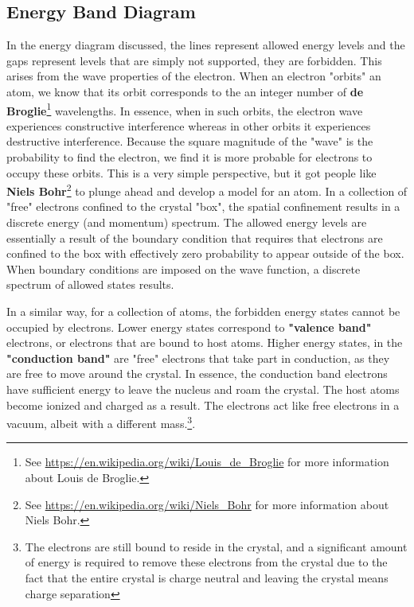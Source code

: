 \subsection{Energy Band Diagram}
In the energy diagram discussed, the lines represent allowed energy levels and the gaps represent levels that are simply not supported, they are forbidden.  This arises from the wave properties of the electron.  When an electron "orbits" an atom, we know that its orbit corresponds to the an integer number of \textbf{de Broglie}\footnote{See \url{https://en.wikipedia.org/wiki/Louis_de_Broglie} for more information about Louis de Broglie.} wavelengths.  In essence, when in such orbits, the electron wave experiences constructive interference whereas in other orbits it experiences destructive interference.  Because the square magnitude of the "wave" is the probability to find the electron, we find it is more probable for electrons to occupy these orbits.  This is a very simple perspective, but it got people like \textbf{Niels Bohr}\footnote{See \url{https://en.wikipedia.org/wiki/Niels_Bohr} for more information about Niels Bohr.} to plunge ahead and develop a model for an atom.  In a collection of "free" electrons confined to the crystal "box", the spatial confinement results in a discrete energy (and momentum) spectrum.  The allowed energy levels are essentially a result of the boundary condition that requires that electrons are confined to the box with effectively zero probability to appear outside of the box.  When boundary conditions are imposed on the wave function, a discrete spectrum of allowed states results. 

In a similar way, for a collection of atoms, the forbidden energy states cannot be occupied by electrons.  Lower energy states correspond to \textbf{"valence band"} electrons, or electrons that are bound to host atoms.  Higher energy states, in the \textbf{"conduction band"} are "free" electrons that take part in conduction, as they are free to move around the crystal.  In essence, the conduction band electrons have sufficient energy to leave the nucleus and roam the crystal.  The host atoms become ionized and charged as a result.  The electrons act like free electrons in a vacuum, albeit with a different mass.\footnote{The electrons are still bound to reside in the crystal, and a significant amount of energy is required to remove these electrons from the crystal due to the fact that the entire crystal is charge neutral and leaving the crystal means charge separation}. 

